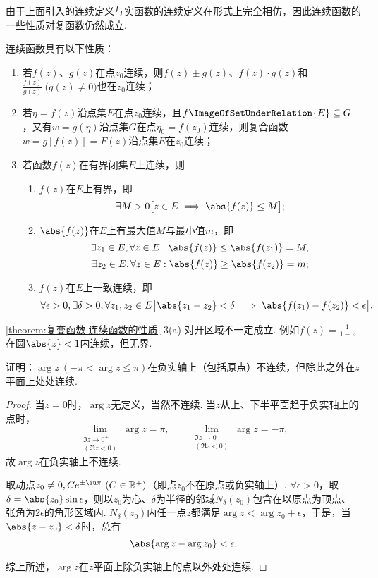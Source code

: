 由于上面引入的连续定义与实函数的连续定义在形式上完全相仿，因此连续函数的一些性质对复函数仍然成立.
\begin{property}\label{theorem:复变函数.连续函数的性质}
连续函数具有以下性质：
\begin{enumerate}
\item 若\(f(z)\)、\(g(z)\)在点\(z_0\)连续，则\(f(z) \pm g(z)\)、\(f(z) \cdot g(z)\)和\(\frac{f(z)}{g(z)}\ \bigl(g(z) \neq 0\bigr)\)也在\(z_0\)连续；

\item 若\(\eta = f(z)\)沿点集\(E\)在点\(z_0\)连续，且\(f\ImageOfSetUnderRelation{E} \subseteq G\)，又有\(w=g(\eta)\)沿点集\(G\)在点\(\eta_0=f(z_0)\)连续，则复合函数\(w=g[f(z)]=F(z)\)沿点集\(E\)在\(z_0\)连续；

\item 若函数\(f(z)\)在有界闭集\(E\)上连续，则\begin{enumerate}
\item\label{theorem:复变函数.连续函数的性质.3a} \(f(z)\)在\(E\)上有界，即\[
\exists M>0 \bigl[
z \in E \implies \abs{f(z)} \leq M
\bigr];
\]

\item\label{theorem:复变函数.连续函数的性质.3b} \(\abs{f(z)}\)在\(E\)上有最大值\(M\)与最小值\(m\)，即\[
\exists z_1 \in E, \forall z \in E : \abs{f(z)} \leq \abs{f(z_1)} = M,
\]\[
\exists z_2 \in E, \forall z \in E : \abs{f(z)} \geq \abs{f(z_2)} = m;
\]

\item\label{theorem:复变函数.连续函数的性质.3c} \(f(z)\)在\(E\)上一致连续，即\[
\forall \epsilon>0, \exists \delta>0, \forall z_1,z_2 \in E \bigl[
\abs{z_1-z_2}<\delta
\implies
\abs{f(z_1)-f(z_2)}<\epsilon
\bigr].
\]
\end{enumerate}
\end{enumerate}
\end{property}
\cref{theorem:复变函数.连续函数的性质}  3(a) 对开区域不一定成立.
例如\(f(z) = \frac{1}{1-z}\)在圆\(\abs{z} < 1\)内连续，但无界.

\begin{example}
证明：\(\arg z\ (-\pi < \arg z \leq \pi)\)在负实轴上（包括原点）不连续，但除此之外在\(z\)平面上处处连续.
\begin{proof}
当\(z = 0\)时，\(\arg z\)无定义，当然不连续.
当\(z\)从上、下半平面趋于负实轴上的点时，\[
\lim_{\substack{\Im z \to 0^+ \\ (\Re z < 0)}} \arg z = \pi,
\qquad
\lim_{\substack{\Im z \to 0^- \\ (\Re z < 0)}} \arg z = -\pi,
\]故\(\arg z\)在负实轴上不连续.

取动点\(z_0\neq0,Ce^{\pm\iu\pi}\ (C\in\mathbb{R}^+)\)（即点\(z_0\)不在原点或负实轴上）.
\(\forall \epsilon > 0\)，取\(\delta = \abs{z_0} \sin\epsilon\)，则以\(z_0\)为心、\(\delta\)为半径的邻域\(N_{\delta}(z_0)\)包含在以原点为顶点、张角为\(2\epsilon\)的角形区域内.
\(N_{\delta}(z_0)\)内任一点\(z\)都满足\(\arg z < \arg z_0 + \epsilon\)，于是，当\(\abs{z - z_0} < \delta\)时，总有\[
\abs{\arg z - \arg z_0} < \epsilon.
\]

综上所述，\(\arg z\)在\(z\)平面上除负实轴上的点以外处处连续.
\end{proof}
\end{example}
